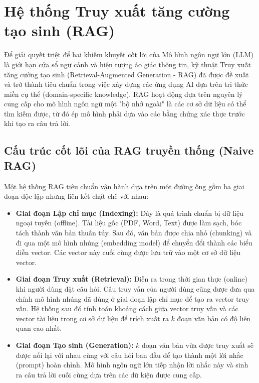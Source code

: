\section{Hệ thống Truy xuất tăng cường tạo sinh (RAG)}

Để giải quyết triệt để hai khiếm khuyết cốt lõi của Mô hình ngôn ngữ lớn (LLM) là giới hạn cửa sổ ngữ cảnh và hiện tượng ảo giác thông tin, kỹ thuật Truy xuất tăng cường tạo sinh (Retrieval-Augmented Generation - RAG) đã được đề xuất và trở thành tiêu chuẩn trong việc xây dựng các ứng dụng AI dựa trên tri thức miền cụ thể (domain-specific knowledge). RAG hoạt động dựa trên nguyên lý cung cấp cho mô hình ngôn ngữ một "bộ nhớ ngoài" là các cơ sở dữ liệu có thể tìm kiếm được, từ đó ép mô hình phải dựa vào các bằng chứng xác thực trước khi tạo ra câu trả lời. \cite{lewis2020retrieval,gao2023retrieval}

\subsection{Cấu trúc cốt lõi của RAG truyền thống (Naive RAG)}
Một hệ thống RAG tiêu chuẩn vận hành dựa trên một đường ống gồm ba giai đoạn độc lập nhưng liên kết chặt chẽ với nhau:

\begin{itemize}
    \item \textbf{Giai đoạn Lập chỉ mục (Indexing):} Đây là quá trình chuẩn bị dữ liệu ngoại tuyến (offline). Tài liệu gốc (PDF, Word, Text) được làm sạch, bóc tách thành văn bản thuần túy. Sau đó, văn bản được chia nhỏ (chunking) và đi qua một mô hình nhúng (embedding model) để chuyển đổi thành các biểu diễn vector. Các vector này cuối cùng được lưu trữ vào một cơ sở dữ liệu vector.
    \item \textbf{Giai đoạn Truy xuất (Retrieval):} Diễn ra trong thời gian thực (online) khi người dùng đặt câu hỏi. Câu truy vấn của người dùng cũng được đưa qua chính mô hình nhúng đã dùng ở giai đoạn lập chỉ mục để tạo ra vector truy vấn. Hệ thống sau đó tính toán khoảng cách giữa vector truy vấn và các vector tài liệu trong cơ sở dữ liệu để trích xuất ra $k$ đoạn văn bản có độ liên quan cao nhất.
    \item \textbf{Giai đoạn Tạo sinh (Generation):} $k$ đoạn văn bản vừa được truy xuất sẽ được nối lại với nhau cùng với câu hỏi ban đầu để tạo thành một lời nhắc (prompt) hoàn chỉnh. Mô hình ngôn ngữ lớn tiếp nhận lời nhắc này và sinh ra câu trả lời cuối cùng dựa trên các dữ kiện được cung cấp.
\end{itemize}

